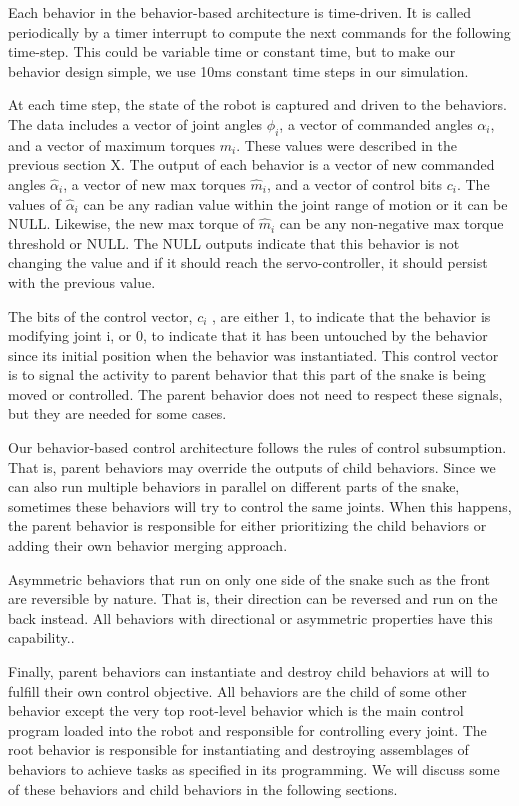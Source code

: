 Each behavior in the behavior-based architecture is time-driven.  It is called periodically by a timer interrupt to compute the next commands for the following time-step.  This could be variable time or constant time, but to make our behavior design simple, we use 10ms constant time steps in our simulation.

At each time step, the state of the robot is captured and driven to the behaviors.  The data includes a vector of joint angles $\phi_i$, a vector of commanded angles $\alpha_i$, and a vector of maximum torques $m_i$.  These values were described in the previous section X.  The output of each behavior is a vector of new commanded angles $\hat{\alpha}_i$, a vector of new max torques $\hat{m}_i$, and a vector of control bits $c_i$.  The values of $\hat{\alpha}_i$ can be any radian value within the joint range of motion or it can be NULL.  Likewise, the new max torque of $\hat{m}_i$ can be any non-negative max torque threshold or NULL.  The NULL outputs indicate that this behavior is not changing the value and if it should reach the servo-controller, it should persist with the previous value.

The bits of the control vector, $c_i$ , are either 1, to indicate that the behavior is modifying joint i, or 0, to indicate that it has been untouched by the behavior since its initial position when the behavior was instantiated.  This control vector is to signal the activity to parent behavior that this part of the snake is being moved or controlled.  The parent behavior does not need to respect these signals, but they are needed for some cases.

Our behavior-based control architecture follows the rules of control subsumption.  That is, parent behaviors may override the outputs of child behaviors.  Since we can also run multiple behaviors in parallel on different parts of the snake, sometimes these behaviors will try to control the same joints.  When this happens, the parent behavior is responsible for either prioritizing the child behaviors or adding their own behavior merging approach.

Asymmetric behaviors that run on only one side of the snake such as the front are reversible by nature.  That is, their direction can be reversed and run on the back instead.  All behaviors with directional or asymmetric properties have this capability..

Finally, parent behaviors can instantiate and destroy child behaviors at will to fulfill their own control objective.  All behaviors are the child of some other behavior except the very top root-level behavior which is the main control program loaded into the robot and responsible for controlling every joint.  The root behavior is responsible for instantiating and destroying assemblages of behaviors to achieve tasks as specified in its programming.  We will discuss some of these behaviors and child behaviors in the following sections.

